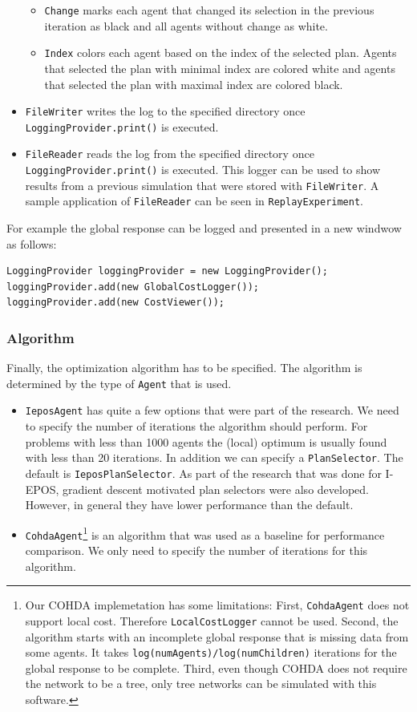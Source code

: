 \documentclass[11pt]{article} %
\newcommand{\code}{\texttt}
\begin{document}
\begin{itemize}
	\begin{itemize}
		\item \code{Change} marks each agent that changed its selection in the previous iteration as black and all agents without change as white.
		\item \code{Index} colors each agent based on the index of the selected plan. Agents that selected the plan with minimal index are colored white and agents that selected the plan with maximal index are colored black.
	\end{itemize}
	\item \code{FileWriter} writes the log to the specified directory once \code{LoggingProvider.print()} is executed.
	\item \code{FileReader} reads the log from the specified directory once \code{LoggingProvider.print()} is executed. This logger can be used to show results from a previous simulation that were stored with \code{FileWriter}. A sample application of \code{FileReader} can be seen in \code{ReplayExperiment}.
\end{itemize}

\noindent For example the global response can be logged and presented in a new windwow as follows:
\begin{verbatim}
LoggingProvider loggingProvider = new LoggingProvider();
loggingProvider.add(new GlobalCostLogger());
loggingProvider.add(new CostViewer());
\end{verbatim}

\subsubsection*{Algorithm}
Finally, the optimization algorithm has to be specified. The algorithm is determined by the type of \code{Agent} that is used.
\begin{itemize}
	\item \code{IeposAgent} has quite a few options that were part of the research. We need to specify the number of iterations the algorithm should perform. For problems with less than 1000 agents the (local) optimum is usually found with less than 20 iterations. In addition we can specify a \code{PlanSelector}. The default is \code{IeposPlanSelector}. As part of the research that was done for I-EPOS, gradient descent motivated plan selectors were also developed. However, in general they have lower performance than the default.
	\item \code{CohdaAgent}\footnote{Our COHDA implemetation has some limitations: First, \code{CohdaAgent} does not support local cost. Therefore \code{LocalCostLogger} cannot be used. Second, the algorithm starts with an incomplete global response that is missing data from some agents. It takes \code{log(numAgents)/log(numChildren)} iterations for the global response to be complete. Third, even though COHDA does not require the network to be a tree, only tree networks can be simulated with this software.} is an algorithm that was used as a baseline for performance comparison. We only need to specify the number of iterations for this algorithm.
\end{itemize}
\end{document}
